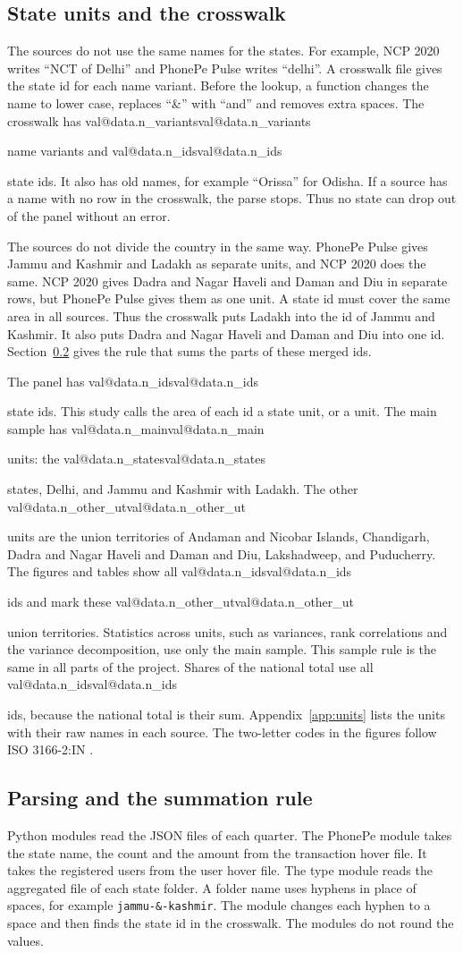 \documentclass[11pt,a4paper]{article}
\makeatletter
\newcommand{\val}[1]{\ifcsname val@#1\endcsname\csname val@#1\endcsname\else
  \PackageError{study}{Unknown value key `#1'}{Run Rscript src/R/part1_study.R}\fi}
\makeatother
\begin{document}
\subsection{State units and the crosswalk}\label{sec:units}
The sources do not use the same names for the states. For example, NCP 2020 writes ``NCT of Delhi'' and PhonePe Pulse writes ``delhi''. A crosswalk file gives the state id for each name variant. Before the lookup, a function changes the name to lower case, replaces ``\&'' with ``and'' and removes extra spaces. The crosswalk has \val{data.n_variants} name variants and \val{data.n_ids} state ids. It also has old names, for example ``Orissa'' for Odisha. If a source has a name with no row in the crosswalk, the parse stops. Thus no state can drop out of the panel without an error.

The sources do not divide the country in the same way. PhonePe Pulse gives Jammu and Kashmir and Ladakh as separate units, and NCP 2020 does the same. NCP 2020 gives Dadra and Nagar Haveli and Daman and Diu in separate rows, but PhonePe Pulse gives them as one unit. A state id must cover the same area in all sources. Thus the crosswalk puts Ladakh into the id of Jammu and Kashmir. It also puts Dadra and Nagar Haveli and Daman and Diu into one id. Section~\ref{sec:parsing} gives the rule that sums the parts of these merged ids.

The panel has \val{data.n_ids} state ids. This study calls the area of each id a state unit, or a unit. The main sample has \val{data.n_main} units: the \val{data.n_states} states, Delhi, and Jammu and Kashmir with Ladakh. The other \val{data.n_other_ut} units are the union territories of Andaman and Nicobar Islands, Chandigarh, Dadra and Nagar Haveli and Daman and Diu, Lakshadweep, and Puducherry. The figures and tables show all \val{data.n_ids} ids and mark these \val{data.n_other_ut} union territories. Statistics across units, such as variances, rank correlations and the variance decomposition, use only the main sample. This sample rule is the same in all parts of the project. Shares of the national total use all \val{data.n_ids} ids, because the national total is their sum. Appendix~\ref{app:units} lists the units with their raw names in each source. The two-letter codes in the figures follow ISO 3166-2:IN \citep{iso3166_2_in}.

\subsection{Parsing and the summation rule}\label{sec:parsing}
Python modules read the JSON files of each quarter. The PhonePe module takes the state name, the count and the amount from the transaction hover file. It takes the registered users from the user hover file. The type module reads the aggregated file of each state folder. A folder name uses hyphens in place of spaces, for example \texttt{jammu-\&-kashmir}. The module changes each hyphen to a space and then finds the state id in the crosswalk. The modules do not round the values.
\end{document}
